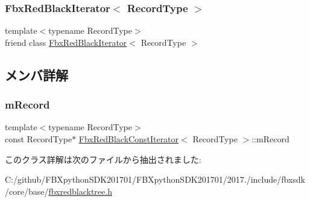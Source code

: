 \subsubsection{\texorpdfstring{Fbx\+Red\+Black\+Iterator$<$ Record\+Type $>$}{FbxRedBlackIterator< RecordType >}}
{\footnotesize\ttfamily template$<$typename Record\+Type$>$ \\
friend class \hyperlink{class_fbx_red_black_iterator}{Fbx\+Red\+Black\+Iterator}$<$ Record\+Type $>$\hspace{0.3cm}{\ttfamily [friend]}}



\subsection{メンバ詳解}
\mbox{\label{class_fbx_red_black_const_iterator_a81e85ea2f1580a368b2352a72295dd06}} 
\subsubsection{\texorpdfstring{m\+Record}{mRecord}}
{\footnotesize\ttfamily template$<$typename Record\+Type$>$ \\
const Record\+Type$\ast$ \hyperlink{class_fbx_red_black_const_iterator}{Fbx\+Red\+Black\+Const\+Iterator}$<$ Record\+Type $>$\+::m\+Record\hspace{0.3cm}{\ttfamily [protected]}}



このクラス詳解は次のファイルから抽出されました\+:\begin{DoxyCompactItemize}
\item 
C\+:/github/\+F\+B\+Xpython\+S\+D\+K201701/\+F\+B\+Xpython\+S\+D\+K201701/2017./include/fbxsdk/core/base/\hyperlink{fbxredblacktree_8h}{fbxredblacktree.\+h}\end{DoxyCompactItemize}
